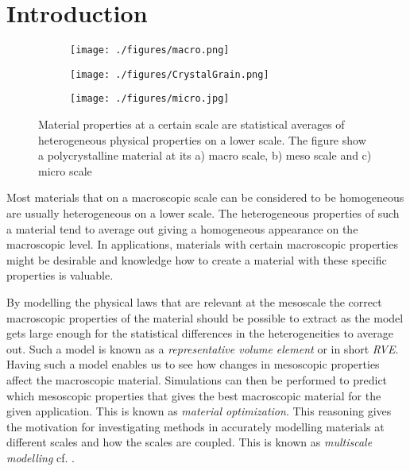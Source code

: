 \documentclass[introduction.tex]{subfiles}
\begin{document}
\chapter{Introduction}



 \begin{figure}
\centering

\begin{subfigure}{.1\textwidth}
  \centering
  \texttt{[image: ./figures/macro.png]}
  \caption{}
  \label{fig:macro}
\end{subfigure}
\scalebox{1.5}{$\boldsymbol{\longleftarrow}$}
\begin{subfigure}{.33\textwidth}
  \centering
  \texttt{[image: ./figures/CrystalGrain.png]}
  \caption{}
  \label{fig:meso}
\end{subfigure}%
\scalebox{1.5}{$\boldsymbol{\longleftarrow}$}
\begin{subfigure}{.33\textwidth}
  \centering
  \texttt{[image: ./figures/micro.jpg]}
  \caption{}
  \label{fig:micro}
\end{subfigure}
\caption{Material properties at a certain scale are statistical averages of heterogeneous physical properties on a lower scale. The figure show a polycrystalline material at its a) macro scale, b) meso scale\cite{wiki:grain} and c) micro scale\cite{Ozawa:ko5009}}
\label{micmacmes}
\end{figure}


Most materials that on a macroscopic scale can be considered to be homogeneous are usually heterogeneous on a lower scale. The heterogeneous properties of such a material tend to average out giving a homogeneous appearance on the macroscopic level. In applications, materials with certain macroscopic properties might be desirable and knowledge how to create a material with these specific properties is valuable. 

By modelling the physical laws that are relevant at the mesoscale the correct macroscopic properties of the material should be possible to extract as the model gets large enough for the statistical differences in the heterogeneities to average out. Such a model is known as a \textit{representative volume element} or in short \textit{RVE}. Having such a model enables us to see how changes in mesoscopic properties affect the macroscopic material. Simulations can then be performed to predict which mesoscopic properties that gives the best macroscopic material for the given application. This is known as \textit{material optimization}. This reasoning gives the motivation for investigating methods in accurately modelling materials at different scales and how the scales are coupled. This is known as \textit{multiscale modelling} cf. \cite{zohdi}.
\end{document}
